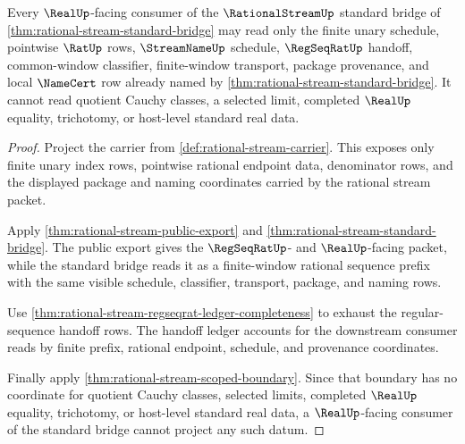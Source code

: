 \begin{theorem}\label{thm:rational-stream-real-seal-consumer-boundary}
Every $\RealUp$-facing consumer of the $\RationalStreamUp$ standard bridge of
\autoref{thm:rational-stream-standard-bridge} may read only the finite unary
schedule, pointwise $\RatUp$ rows, $\StreamNameUp$ schedule, $\RegSeqRatUp$
handoff, common-window classifier, finite-window transport, package provenance,
and local $\NameCert$ row already named by
\autoref{thm:rational-stream-standard-bridge}. It cannot read quotient Cauchy
classes, a selected limit, completed $\RealUp$ equality, trichotomy, or
host-level standard real data.
\end{theorem}
\begin{proof}
Project the carrier from \autoref{def:rational-stream-carrier}. This exposes
only finite unary index rows, pointwise rational endpoint data, denominator
rows, and the displayed package and naming coordinates carried by the rational
stream packet.

Apply \autoref{thm:rational-stream-public-export} and
\autoref{thm:rational-stream-standard-bridge}. The public export gives the
$\RegSeqRatUp$- and $\RealUp$-facing packet, while the standard bridge reads it
as a finite-window rational sequence prefix with the same visible schedule,
classifier, transport, package, and naming rows.

Use \autoref{thm:rational-stream-regseqrat-ledger-completeness} to exhaust the
regular-sequence handoff rows. The handoff ledger accounts for the downstream
consumer reads by finite prefix, rational endpoint, schedule, and provenance
coordinates.

Finally apply \autoref{thm:rational-stream-scoped-boundary}. Since that boundary
has no coordinate for quotient Cauchy classes, selected limits, completed
$\RealUp$ equality, trichotomy, or host-level standard real data, a
$\RealUp$-facing consumer of the standard bridge cannot project any such datum.
\end{proof}

